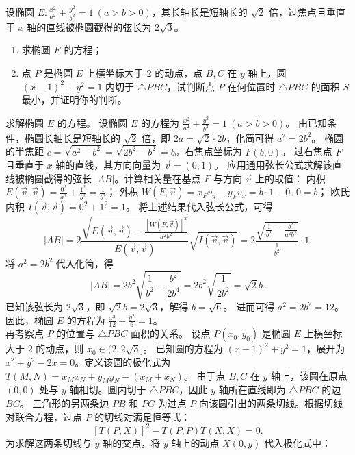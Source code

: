 \begin{example}
设椭圆 \(E: \frac{x^2}{a^2} + \frac{y^2}{b^2} = 1\ (a > b > 0)\)，其长轴长是短轴长的 \(\sqrt{2}\) 倍，过焦点且垂直于 \(x\) 轴的直线被椭圆截得的弦长为 \(2\sqrt{3}\)。
\begin{enumerate}
    \item[(1)] 求椭圆 \(E\) 的方程；
    \item[(2)] 点 \(P\) 是椭圆 \(E\) 上横坐标大于 \(2\) 的动点，点 \(B,C\) 在 \(y\) 轴上，圆 \((x-1)^2 + y^2 = 1\) 内切于 \(\triangle PBC\)，试判断点 \(P\) 在何位置时 \(\triangle PBC\) 的面积 \(S\) 最小，并证明你的判断。
\end{enumerate}
\end{example}
\begin{solution}
求解椭圆 $E$ 的方程。
设椭圆 $E$ 的方程为 $\frac{x^2}{a^2} + \frac{y^2}{b^2} = 1\ (a > b > 0)$。
由已知条件，椭圆长轴长是短轴长的 $\sqrt{2}$ 倍，即 $2a = \sqrt{2} \cdot 2b$，化简可得 $a^2 = 2b^2$。
椭圆的半焦距 $c = \sqrt{a^2 - b^2} = \sqrt{2b^2 - b^2} = b$。右焦点坐标为 $F(b, 0)$。
过右焦点 $F$ 且垂直于 $x$ 轴的直线，其方向向量为 $\vec{v} = (0, 1)$。
应用通用弦长公式求解该直线被椭圆截得的弦长 $|AB|$。计算相关量在基点 $F$ 与方向 $\vec{v}$ 上的取值：
内积 $E(\vec{v}, \vec{v}) = \frac{0^2}{a^2} + \frac{1^2}{b^2} = \frac{1}{b^2}$；
外积 $W(F, \vec{v}) = x_F v_y - y_F v_x = b \cdot 1 - 0 \cdot 0 = b$；
欧氏内积 $I(\vec{v}, \vec{v}) = 0^2 + 1^2 = 1$。
将上述结果代入弦长公式，可得
\[ |AB| = 2 \frac{\sqrt{E(\vec{v},\vec{v}) - \frac{\left[W(F,\vec{v})\right]^2}{a^2 b^2}}}{E(\vec{v},\vec{v})} \sqrt{I(\vec{v},\vec{v})} = 2 \frac{\sqrt{\frac{1}{b^2} - \frac{b^2}{a^2 b^2}}}{\frac{1}{b^2}} \cdot 1. \]
将 $a^2 = 2b^2$ 代入化简，得
\[ |AB| = 2b^2 \sqrt{\frac{1}{b^2} - \frac{b^2}{2b^4}} = 2b^2 \sqrt{\frac{1}{2b^2}} = \sqrt{2}b. \]
已知该弦长为 $2\sqrt{3}$，即 $\sqrt{2}b = 2\sqrt{3}$，解得 $b = \sqrt{6}$。
进而可得 $a^2 = 2b^2 = 12$。因此，椭圆 $E$ 的方程为 $\frac{x^2}{12} + \frac{y^2}{6} = 1$。\\
再考察点 $P$ 的位置与 $\triangle PBC$ 面积的关系。
设点 $P(x_0, y_0)$ 是椭圆 $E$ 上横坐标大于 $2$ 的动点，则 $x_0 \in (2, 2\sqrt{3}]$。
已知圆的方程为 $(x-1)^2 + y^2 = 1$，展开为 $x^2 + y^2 - 2x = 0$。定义该圆的极化式为 $T(M, N) = x_M x_N + y_M y_N - (x_M + x_N)$。
由于点 $B, C$ 在 $y$ 轴上，该圆在原点 $(0,0)$ 处与 $y$ 轴相切。圆内切于 $\triangle PBC$，因此 $y$ 轴所在直线即为 $\triangle PBC$ 的边 $BC$。
三角形的另两条边 $PB$ 和 $PC$ 为过点 $P$ 向该圆引出的两条切线。根据切线对联合方程，过点 $P$ 的切线对满足恒等式：
\[ \left[T(P, X)\right]^2 - T(P, P)T(X, X) = 0. \]
为求解这两条切线与 $y$ 轴的交点，将 $y$ 轴上的动点 $X(0, y)$ 代入极化式中：

\end{solution}
